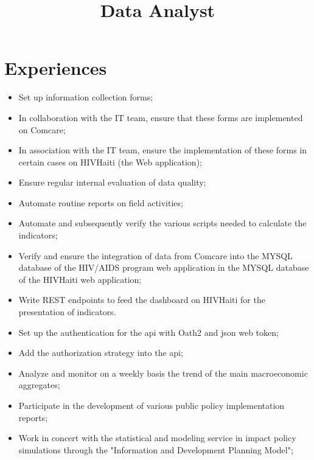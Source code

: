 \documentclass[11pt,a4paper]{moderncv}
\title{Data Analyst}
\begin{document}
\maketitle

\section{Experiences}
{
	\begin{itemize}%
		\item Set up information collection forms;
		\item In collaboration with the IT team, ensure that these forms are implemented on Comcare;
		\item In association with the IT team, ensure the implementation of these forms in certain cases on HIVHaiti (the Web application);
        \item Ensure regular internal evaluation of data quality;
		\item Automate routine reports on field activities;
		\item Automate and subsequently verify the various scripts needed to calculate the indicators;
		\item Verify and ensure the integration of data from Comcare into the MYSQL database of the HIV/AIDS program web application in the MYSQL database of the HIVHaiti web application;
		\item Write REST endpoints to feed the dashboard on HIVHaiti for the presentation of indicators.
	\end{itemize}
}
{
	\begin{itemize}%
		\item  Set up the authentication for the api with Oath2 and json web token;
		\item  Add the authorization strategy into the api;
	\end{itemize}
}
{
	\begin{itemize}%
		\item Analyze and monitor on a weekly basis the trend of the main macroeconomic aggregates;
		\item Participate in the development of various public policy implementation reports;
		\item Work in concert with the statistical and modeling service in impact policy simulations through the "Information and Development Planning Model";
	\end{itemize}
}
\end{document}
